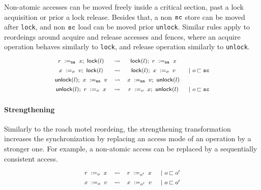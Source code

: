 Non-atomic accesses can be moved freely inside 
a critical section, \ie past a lock acquisition
or prior a lock release. 
Besides that, a non ${\mathtt{sc}}$ store can be moved after \texttt{lock}, 
and non ${\mathtt{sc}}$ load can be moved prior \texttt{unlock}.   
Similar rules apply to reordeings around 
acquire and release accesses and fences, 
where an acquire operation behaves similarly to \texttt{lock}, 
and release operation similarly to \texttt{unlock}.
\[\def\arraystretch{1.4}\footnotesize
  \begin{array}{cccl} 

      \readInst{\na}{r}{x} \seq \lockInst{l} 
    & \leadsto 
    & \lockInst{l} \seq \readInst{\na}{r}{x}
    & ~ \\ 

      \writeInst{o}{x}{v} \seq \lockInst{l} 
    & \leadsto 
    & \lockInst{l} \seq \writeInst{o}{x}{v}
    & ~|~ o \sqsubset \sco  \\ 

      \unlockInst{l} \seq \writeInst{\na}{x}{v} 
    & \leadsto 
    & \writeInst{\na}{x}{v} \seq \unlockInst{l}
    & ~ \\ 


      \unlockInst{l} \seq \readInst{o}{r}{x} 
    & \leadsto 
    & \readInst{o}{r}{x} \seq \unlockInst{l}
    & ~|~ o \sqsubset \sco  \\ 

  \end{array}
\]


\paragraph{Strengthening}

Similarly to the roach motel reordeing, the strengthening
transformation increases the synchronization by 
replacing an access mode of an operation by a stronger one. 
For example, a non-atomic access can be replaced by 
a sequentially consistent access. 
%
\[\def\arraystretch{1.4}\footnotesize
  \begin{array}{cccl} 

      \readInst{o}{r}{x} 
    & \leadsto 
    & \readInst{o'}{r}{x}
    & ~|~ o \sqsubset o' \\ 

      \writeInst{o}{x}{v}
    & \leadsto 
    & \writeInst{o'}{x}{v}
    & ~|~ o \sqsubset o'  \\ 

  \end{array}
\]


